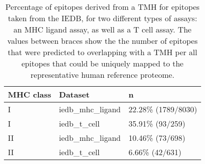 \begin{table}[ht]
\centering
\begin{tabular}{lll}
  \hline
MHC class & Dataset & n \\ 
  \hline
I & iedb\_mhc\_ligand & 22.28\% (1789/8030) \\ 
  I & iedb\_t\_cell & 35.91\% (93/259) \\ 
  II & iedb\_mhc\_ligand & 10.46\% (73/698) \\ 
  II & iedb\_t\_cell &  6.66\% (42/631) \\ 
   \hline
\end{tabular}
\caption{Percentage of epitopes derived from a TMH for epitopes taken from the IEDB, for two different types of assays:  an MHC ligand assay, as well as a T cell assay.  The values between braces show the the number of epitopes that were predicted to overlapping with a TMH per all epitopes that could be uniquely mapped to the representative human reference proteome.} 
\label{tab:elution}
\end{table}
